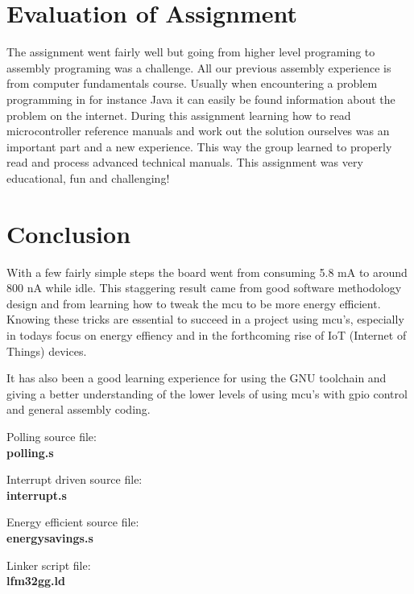 \section{Evaluation of Assignment}
The assignment went fairly well but going from higher level programing to assembly programing was a challenge. All our previous assembly experience is from computer fundamentals course. Usually when encountering a problem programming in for instance Java it can easily be found information about the problem on the internet. During this assignment learning how to read microcontroller reference manuals and work out the solution ourselves was an important part and a new experience. This way the group learned to properly read and process advanced technical manuals. This assignment was very educational, fun and challenging!

\section{Conclusion}
With a few fairly simple steps the board went from consuming 5.8 mA to around 800 nA while idle. This  staggering result came from good software methodology design and from learning how to tweak the mcu to be more energy efficient. Knowing these tricks are essential to succeed in a project using mcu's, especially in todays focus on energy effiency and in the forthcoming rise of IoT (Internet of Things) devices.

It has also been a good learning experience for using the GNU toolchain and giving a better understanding of the lower levels of using mcu's with gpio control and general assembly coding.


\begin{thebibliography}{1}

 Polling source file:\\
\textbf{polling.s}

 Interrupt driven source file:\\
\textbf{interrupt.s}

 Energy efficient source file:\\
\textbf{energysavings.s}

 Linker script file:\\
\textbf{lfm32gg.ld}

\end{thebibliography}


